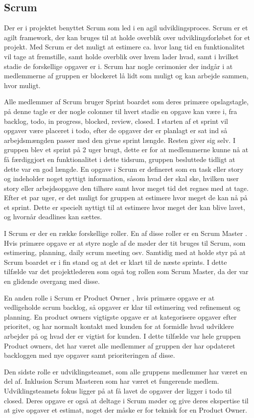 \subsection{Scrum}

Der er i projektet benyttet Scrum  som led i en agil udviklingsproces. Scrum er et agilt framework, der kan bruges til at holde overblik over udviklingsforløbet for et projekt. Med Scrum er det muligt at estimere ca. hvor lang tid en funktionalitet vil tage at fremstille, samt holde overblik over hvem lader hvad, samt i hvilket stadie de forskellige opgaver er i. Scrum har nogle cerimonier der indgår i at medlemmerne af gruppen er blockeret lå lidt som muligt og kan arbejde sammen, hvor muligt.

Alle medlemmer af Scrum bruger Sprint boardet som deres primære opslagstagle, på denne tagle er der nogle colonner til hvert stadie en opgave kan være i, fra backlog, todo, in progress, blocked, review, closed. 
I starten af et sprint vil opgaver være placeret i todo, efter de opgaver der er planlagt er sat ind så arbejdsmængden passer med den givne sprint længde. Resten giver sig selv. I gruppen blev et sprint på 2 uger brugt, dette er for at medlemmerne kunne nå at få færdiggjort en funktionalitet i dette tidsrum, gruppen besluttede tidligt at dette var en god længde. En opgave i Scrum er defineret som en task eller story og indeholder noget nyttigt information, såsom hvad der skal ske, hvilken user story eller arbejdsopgave den tilhøre samt hvor meget tid det regnes med at tage. Efter et par uger, er det muligt for gruppen at estimere hvor meget de kan nå på et sprint. Dette er specielt nyttigt til at estimere hvor meget der kan blive lavet, og hvornår deadlines kan sættes.

I Scrum er der en række forskellige roller. En af disse roller er en Scrum Master . Hvis primære opgave er at styre nogle af de møder der tit bruges til Scrum, som estimering, planning, daily scrum meeting osv. Samtidig med at holde styr på at Scrum boardet er i fin stand og at det er klart til de næste sprints. I dette tilfælde var det projektlederen som også tog rollen som Scrum Master, da der var en glidende overgang med disse.

En anden rolle i Scrum er Product Owner , hvis primære opgave er at vedligeholde scrum backlog, så opgaver er klar til estimering ved refinement og planning. En product owners vigtigste opgave er at kategorisere opgaver efter prioritet, og har normalt kontakt med kunden for at formidle hvad udviklere arbejder på og hvad der er vigtist for kunden. I dette tilfælde var hele gruppen Product owners, det har været alle medlemmer af gruppen der har opdateret backloggen med nye opgaver samt prioriteringen af disse.

Den sidste rolle er udviklingsteamet, som alle gruppens medlemmer har været en del af. Inklusion Scrum Masteren som har været et fungerende medlem. Udviklingsteamets fokus ligger på at få lavet de opgaver der ligger i todo til closed. Deres opgave er også at deltage i Scrum møder og give deres ekspertise til at give opgaver et estimat, noget der måske er for teknisk for en Product Owner.
